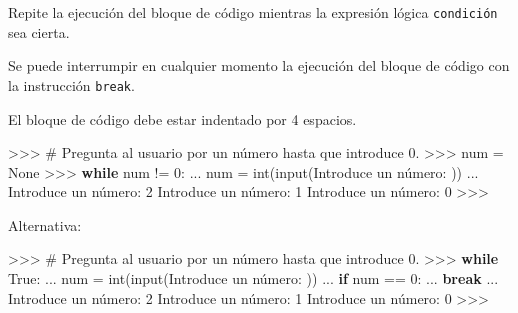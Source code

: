 \documentclass[
  spanish,
  a4paper,
]{scrreport}
\newenvironment{Shaded}{\begin{snugshade}}{\end{snugshade}}
\newcommand{\BuiltInTok}[1]{\textcolor[rgb]{0.00,0.23,0.31}{#1}}
\newcommand{\CommentTok}[1]{\textcolor[rgb]{0.37,0.37,0.37}{#1}}
\newcommand{\ControlFlowTok}[1]{\textcolor[rgb]{0.00,0.23,0.31}{\textbf{#1}}}
\newcommand{\DecValTok}[1]{\textcolor[rgb]{0.68,0.00,0.00}{#1}}
\newcommand{\NormalTok}[1]{\textcolor[rgb]{0.00,0.23,0.31}{#1}}
\newcommand{\OperatorTok}[1]{\textcolor[rgb]{0.37,0.37,0.37}{#1}}
\newcommand{\StringTok}[1]{\textcolor[rgb]{0.13,0.47,0.30}{#1}}
\newcommand{\VariableTok}[1]{\textcolor[rgb]{0.07,0.07,0.07}{#1}}
\begin{document}
Repite la ejecución del bloque de código mientras la expresión lógica
\texttt{condición} sea cierta.

Se puede interrumpir en cualquier momento la ejecución del bloque de
código con la instrucción \texttt{break}.

\begin{tcolorbox}[enhanced jigsaw, arc=.35mm, bottomrule=.15mm, bottomtitle=1mm, breakable, colback=white, colbacktitle=quarto-callout-warning-color!10!white, colframe=quarto-callout-warning-color-frame, coltitle=black, left=2mm, leftrule=.75mm, opacityback=0, opacitybacktitle=0.6, rightrule=.15mm, title=\textcolor{quarto-callout-warning-color}{\faExclamationTriangle}\hspace{0.5em}{Advertencia}, titlerule=0mm, toprule=.15mm, toptitle=1mm]

El bloque de código debe estar indentado por 4 espacios.

\end{tcolorbox}

\begin{Shaded}
\begin{Highlighting}[]
\OperatorTok{\textgreater{}\textgreater{}\textgreater{}} \CommentTok{\# Pregunta al usuario por un número hasta que introduce 0.}
\OperatorTok{\textgreater{}\textgreater{}\textgreater{}}\NormalTok{ num }\OperatorTok{=} \VariableTok{None}
\OperatorTok{\textgreater{}\textgreater{}\textgreater{}} \ControlFlowTok{while}\NormalTok{ num }\OperatorTok{!=} \DecValTok{0}\NormalTok{:}
\NormalTok{...     num }\OperatorTok{=} \BuiltInTok{int}\NormalTok{(}\BuiltInTok{input}\NormalTok{(}\StringTok{\textquotesingle{}Introduce un número: \textquotesingle{}}\NormalTok{))}
\NormalTok{... }
\NormalTok{Introduce un número: }\DecValTok{2}
\NormalTok{Introduce un número: }\DecValTok{1}
\NormalTok{Introduce un número: }\DecValTok{0}
\OperatorTok{\textgreater{}\textgreater{}\textgreater{}} 
\end{Highlighting}
\end{Shaded}

Alternativa:

\begin{Shaded}
\begin{Highlighting}[]
\OperatorTok{\textgreater{}\textgreater{}\textgreater{}} \CommentTok{\# Pregunta al usuario por un número hasta que introduce 0.}
\OperatorTok{\textgreater{}\textgreater{}\textgreater{}} \ControlFlowTok{while} \VariableTok{True}\NormalTok{:}
\NormalTok{...     num }\OperatorTok{=} \BuiltInTok{int}\NormalTok{(}\BuiltInTok{input}\NormalTok{(}\StringTok{\textquotesingle{}Introduce un número: \textquotesingle{}}\NormalTok{))}
\NormalTok{...     }\ControlFlowTok{if}\NormalTok{ num }\OperatorTok{==} \DecValTok{0}\NormalTok{:}
\NormalTok{...         }\ControlFlowTok{break}
\NormalTok{...}
\NormalTok{Introduce un número: }\DecValTok{2}
\NormalTok{Introduce un número: }\DecValTok{1}
\NormalTok{Introduce un número: }\DecValTok{0}
\OperatorTok{\textgreater{}\textgreater{}\textgreater{}}
\end{Highlighting}
\end{Shaded}
\end{document}
